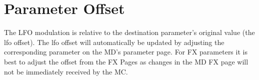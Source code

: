 \section{Parameter Offset}
The LFO modulation is relative to the destination parameter's original value (the lfo offset). The lfo offset will automatically be updated by adjusting the corresponding parameter on the MD's parameter page. For FX parameters it is best to adjust the offset from the FX Pages as changes in the MD FX page will not be immediately received by the MC.